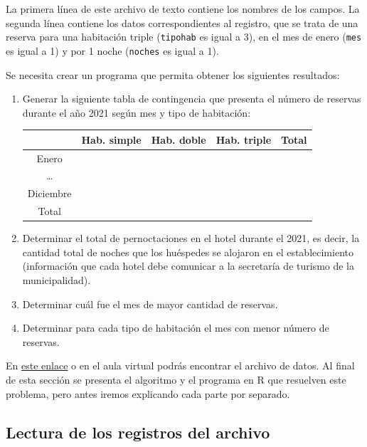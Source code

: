 \documentclass[
]{book}
\begin{document}
La primera línea de este archivo de texto contiene los nombres de los campos. La segunda línea contiene los datos correspondientes al registro, que se trata de una reserva para una habitación triple (\texttt{tipohab} es igual a 3), en el mes de enero (\texttt{mes} es igual a 1) y por 1 noche (\texttt{noches} es igual a 1).

Se necesita crear un programa que permita obtener los siguientes resultados:

\begin{enumerate}
\def\labelenumi{\alph{enumi})}
\item
  Generar la siguiente tabla de contingencia que presenta el número de reservas durante el año 2021 según mes y tipo de habitación:

  \begin{longtable}[]{@{}ccccc@{}}
  \toprule
  & Hab. simple & Hab. doble & Hab. triple & Total \\
  \midrule
  \endhead
  Enero & & & & \\
  \ldots{} & & & & \\
  Diciembre & & & & \\
  Total & & & & \\
  \bottomrule
  \end{longtable}
\item
  Determinar el total de pernoctaciones en el hotel durante el 2021, es decir, la cantidad total de noches que los huéspedes se alojaron en el establecimiento (información que cada hotel debe comunicar a la secretaría de turismo de la municipalidad).
\item
  Determinar cuál fue el mes de mayor cantidad de reservas.
\item
  Determinar para cada tipo de habitación el mes con menor número de reservas.
\end{enumerate}

En \href{https://github.com/mpru/introprog/tree/master/archivos}{este enlace} o en el aula virtual podrás encontrar el archivo de datos. Al final de esta sección se presenta el algoritmo y el programa en R que resuelven este problema, pero antes iremos explicando cada parte por separado.

\hypertarget{lectura-de-los-registros-del-archivo}{%
\subsection{Lectura de los registros del archivo}\label{lectura-de-los-registros-del-archivo}}
\end{document}
